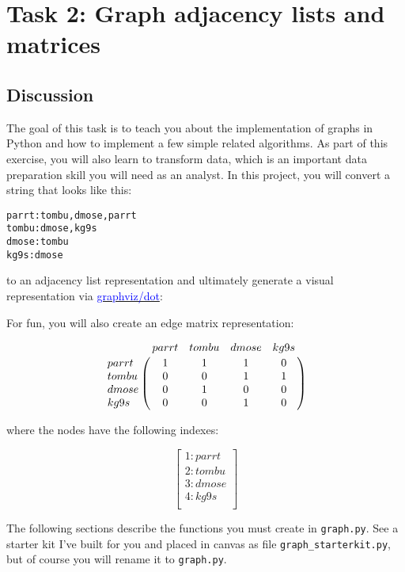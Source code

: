 \chapter{Task 2: Graph adjacency lists and matrices}

\setcounter{problem}{1}
\section{Discussion}

\begin{fullwidth}

The goal of this task is to teach you about the implementation of graphs in Python and how to implement a few simple related algorithms.  As part of this exercise, you will also learn to transform data, which is an important data preparation skill you will need as an analyst.   In this project, you will convert a string that looks like this:

\begin{alltt}\small
parrt: tombu, dmose, parrt
tombu: dmose, kg9s
dmose: tombu
kg9s: dmose
\end{alltt}

\noindent to an adjacency list representation and ultimately generate a visual representation via \href{http://www.graphviz.org/}{\textcolor{blue}{graphviz/dot}}:

\begin{center}
\end{center}

\noindent For fun, you will also create an edge matrix representation:

\[
\bordermatrix{
~ & parrt & tombu & dmose & kg9s \cr
parrt & 1 & 1 & 1 & 0\cr
tombu & 0 & 0 & 1 & 1 \cr
dmose & 0 & 1 & 0 & 0 \cr
kg9s & 0 & 0 & 1 & 0\cr
}
\]

\noindent where the nodes have the following indexes:
 
 \[
\left[
\begin{array}{c}
1: parrt \\
2: tombu \\
3: dmose \\
4: kg9s \\
\end{array}
\right]
\]

The following sections describe the functions you must create in {\tt graph.py}. See a starter kit I've built for you and placed in canvas as file {\tt graph\_starterkit.py}, but of course you will rename it to {\tt graph.py}.


\end{fullwidth}
